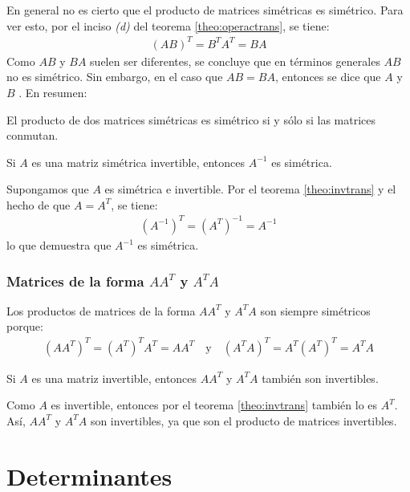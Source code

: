 \documentclass[a4paper,12pt]{article}
\begin{document}
\obse En general no es cierto que el producto de matrices simétricas es
simétrico. Para ver esto, por el inciso \emph{(d)} del teorema
\ref{theo:operactrans}, se tiene:
\begin{align*}
  (AB)^T=B^TA^T=BA
\end{align*}
Como $AB$ y $BA$ suelen ser diferentes, se concluye que en términos generales
$AB$ no es simétrico. Sin embargo, en el caso que $AB=BA$, entonces se dice
que $A$ y $B$ . En resumen:
\begin{concept}[i]
  El producto de dos matrices simétricas es simétrico si y sólo si las
  matrices conmutan.
\end{concept}

\begin{theorem}
  Si $A$ es una matriz simétrica invertible, entonces $A^{-1}$ es simétrica.
  \label{theo:matrsiminv}
\end{theorem}

\demo Supongamos que $A$ es simétrica e invertible. Por el teorema
\ref{theo:invtrans} y el hecho de que $A=A^T$, se tiene:
\begin{align*}
  \left( A^{-1} \right)^T=\left( A^T \right)^{-1}=A^{-1}
\end{align*}
lo que demuestra que $A^{-1}$ es simétrica.

\subsubsection{Matrices de la forma $AA^T$ y $A^TA$}

Los productos de matrices de la forma $AA^T$ y $A^TA$ son siempre simétricos
porque:
\begin{align*}
  \left( AA^T \right)^T = \left( A^T \right)^TA^T = AA^T \quad \mbox{y} \quad
  \left( A^TA \right)^T=A^T\left( A^T \right)^T=A^TA
\end{align*}

\begin{theorem}
  Si $A$ es una matriz invertible, entonces $AA^T$ y $A^TA$ también son
  invertibles.
  \label{theo:invATA}
\end{theorem}

\demo Como $A$ es invertible, entonces por el teorema \ref{theo:invtrans}
también lo es $A^T$. Así, $AA^T$ y $A^TA$ son invertibles, ya que son el
producto de matrices invertibles.


\newpage
\section{Determinantes}
\end{document}
